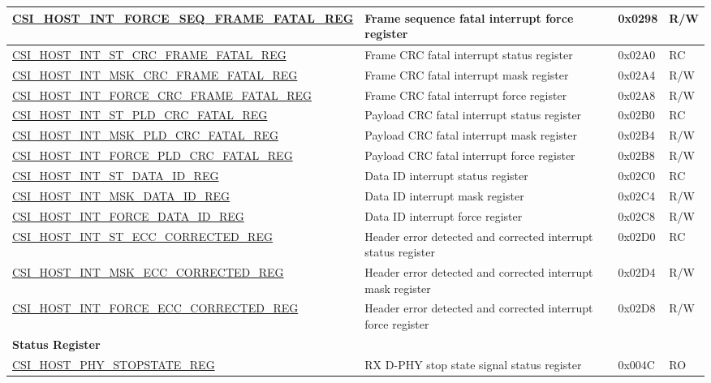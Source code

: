 \begin{longtable}{ | p{9cm} | p{10cm} | p{1.3cm} | p{1.2cm} | }
\hyperref[regdesc:CSIHOSTINTFORCESEQFRAMEFATALREG]{CSI\_HOST\_INT\_FORCE\_SEQ\_FRAME\_FATAL\_REG} & Frame sequence fatal interrupt force register & 0x0298 & R/W \\ \hline
\hyperref[regdesc:CSIHOSTINTSTCRCFRAMEFATALREG]{CSI\_HOST\_INT\_ST\_CRC\_FRAME\_FATAL\_REG} & Frame CRC fatal interrupt status register & 0x02A0 & RC \\ \hline
\hyperref[regdesc:CSIHOSTINTMSKCRCFRAMEFATALREG]{CSI\_HOST\_INT\_MSK\_CRC\_FRAME\_FATAL\_REG} & Frame CRC fatal interrupt mask register & 0x02A4 & R/W \\ \hline
\hyperref[regdesc:CSIHOSTINTFORCECRCFRAMEFATALREG]{CSI\_HOST\_INT\_FORCE\_CRC\_FRAME\_FATAL\_REG} & Frame CRC fatal interrupt force register & 0x02A8 & R/W \\ \hline
\hyperref[regdesc:CSIHOSTINTSTPLDCRCFATALREG]{CSI\_HOST\_INT\_ST\_PLD\_CRC\_FATAL\_REG} & Payload CRC fatal interrupt status register & 0x02B0 & RC \\ \hline
\hyperref[regdesc:CSIHOSTINTMSKPLDCRCFATALREG]{CSI\_HOST\_INT\_MSK\_PLD\_CRC\_FATAL\_REG} & Payload CRC fatal interrupt mask register & 0x02B4 & R/W \\ \hline
\hyperref[regdesc:CSIHOSTINTFORCEPLDCRCFATALREG]{CSI\_HOST\_INT\_FORCE\_PLD\_CRC\_FATAL\_REG} & Payload CRC fatal interrupt force register & 0x02B8 & R/W \\ \hline
\hyperref[regdesc:CSIHOSTINTSTDATAIDREG]{CSI\_HOST\_INT\_ST\_DATA\_ID\_REG} & Data ID interrupt status register & 0x02C0 & RC \\ \hline
\hyperref[regdesc:CSIHOSTINTMSKDATAIDREG]{CSI\_HOST\_INT\_MSK\_DATA\_ID\_REG} & Data ID interrupt mask register & 0x02C4 & R/W \\ \hline
\hyperref[regdesc:CSIHOSTINTFORCEDATAIDREG]{CSI\_HOST\_INT\_FORCE\_DATA\_ID\_REG} & Data ID interrupt force register & 0x02C8 & R/W \\ \hline
\hyperref[regdesc:CSIHOSTINTSTECCCORRECTEDREG]{CSI\_HOST\_INT\_ST\_ECC\_CORRECTED\_REG} & Header error detected and corrected interrupt status register & 0x02D0 & RC \\ \hline
\hyperref[regdesc:CSIHOSTINTMSKECCCORRECTEDREG]{CSI\_HOST\_INT\_MSK\_ECC\_CORRECTED\_REG} & Header error detected and corrected interrupt mask register & 0x02D4 & R/W \\ \hline
\hyperref[regdesc:CSIHOSTINTFORCEECCCORRECTEDREG]{CSI\_HOST\_INT\_FORCE\_ECC\_CORRECTED\_REG} & Header error detected and corrected interrupt force register & 0x02D8 & R/W \\ \hline
\multicolumn{4}{|l|}{\textbf{Status Register}} \\ \hline
\hyperref[regdesc:CSIHOSTPHYSTOPSTATEREG]{CSI\_HOST\_PHY\_STOPSTATE\_REG} & RX D-PHY stop state signal status register & 0x004C & RO \\ \hline
\end{longtable}
